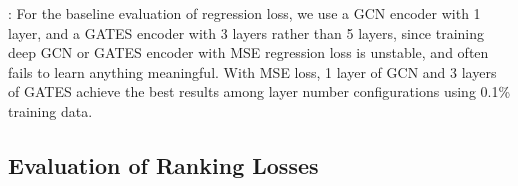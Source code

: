 \documentclass[runningheads]{llncs}
\begin{document}
\begin{table*}[bt]
  \caption{The Kendall’s Tau of using different loss functions on NAS-Bench-101. The first 90\% (381262) architectures in the dataset are used as the training data, and the other 42362 architectures are used as the testing data. All experiments except ``Regression (MSE) + GCN'' are carried out with GATES encoder.}
  \label{table:rank-nb101}
  \begin{center}
    \begin{minipage}{1.0\textwidth}
: For the baseline evaluation of regression loss, we use a GCN encoder with 1 layer, and a GATES encoder with 3 layers rather than 5 layers, since training deep GCN or GATES encoder with MSE regression loss is unstable, and often fails to learn anything meaningful. With MSE loss, 1 layer of GCN and 3 layers of GATES achieve the best results among layer number configurations using 0.1\% training data.
\end{minipage}
  \end{center}
\end{table*}

\subsection{Evaluation of Ranking Losses}
\end{document}
